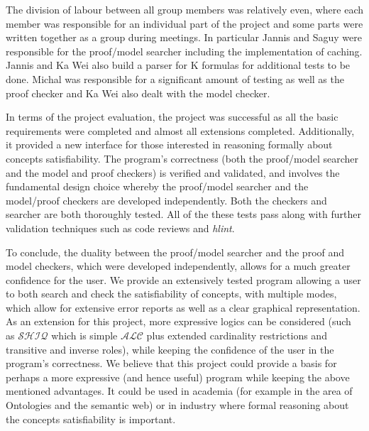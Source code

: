 
The division of labour between all group members was relatively even, where each member was responsible for an individual part of the project and some parts were written together as a group during meetings. In particular Jannis and Saguy were responsible for the proof/model searcher including the implementation of caching. Jannis and Ka Wei also build a parser for K formulas for additional tests to be done. Michal was responsible for a significant amount of testing as well as the proof checker and Ka Wei also dealt with the model checker. 

In terms of the project evaluation, the project was successful as all the basic requirements were completed and almost all extensions completed. Additionally, it provided a new interface for those interested in reasoning formally about concepts satisfiability. The program's correctness (both the proof/model searcher and the model and proof checkers) is verified and validated, and involves the fundamental design choice whereby the proof/model searcher and the model/proof checkers are developed independently. Both the checkers and searcher are both thoroughly tested. All of the these tests pass along with further validation techniques such as code reviews and \emph{hlint}.

To conclude, the duality between the proof/model searcher and the proof and model checkers, which were developed independently, allows for a much greater confidence for the user. We provide an extensively tested program allowing a user to both search and check the satisfiability of concepts, with multiple modes, which allow for extensive error reports as well as a clear graphical representation. As an extension for this project, more expressive logics can be considered (such as $\mathcal{SHIQ}$ which is simple $\mathcal{ALC}$ plus extended cardinality restrictions and transitive and inverse roles), while keeping the confidence of the user in the program's correctness. We believe that this project could provide a basis for perhaps a more expressive (and hence useful) program while keeping the above mentioned advantages. It could be used in academia (for example in the area of Ontologies and the semantic web) or in industry where formal reasoning about the concepts satisfiability is important. 


